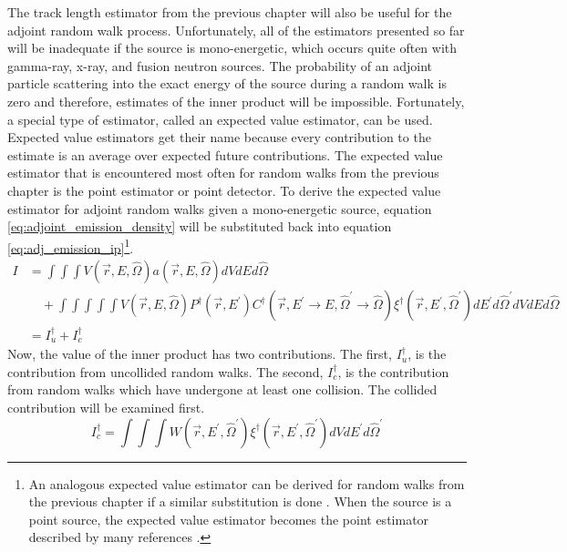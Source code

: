 The track length estimator from the previous chapter will also be useful for the
adjoint random walk process. Unfortunately, all of the estimators presented so
far will be inadequate if the source is mono-energetic, which occurs quite often
with gamma-ray, x-ray, and fusion neutron sources. The probability of an adjoint
particle scattering into the exact energy of the source during a random walk is 
zero and therefore, estimates of the inner product will be impossible. 
Fortunately, a special type of estimator, called an expected value estimator, 
can be used. Expected value estimators get their name because every 
contribution to the estimate is an average over expected future contributions. 
The expected value estimator that is encountered most often for random walks 
from the previous chapter is the point estimator or point detector. To derive 
the expected value estimator for adjoint random walks given a mono-energetic 
source, equation \ref{eq:adjoint_emission_density} will be substituted back 
into equation \ref{eq:adj_emission_ip}\footnote{An analogous expected value 
estimator can be derived for random walks from the previous chapter if a similar
substitution is done \citep{spanier_monte_1969}. When the source is a point 
source, the expected value estimator becomes the point estimator described by
many references \citep{x-5_monte_carlo_team_mcnp_2003, kalos_estimation_1963}.}.
\begin{align}
  I & = \int\int\int V(\vec{r},E,\hat{\Omega})a(\vec{r},E,\hat{\Omega})
  dVdEd\hat{\Omega} \nonumber \\  
  & \quad + \int\int\int\int\int V(\vec{r},E,\hat{\Omega})
  P^{\dagger}(\vec{r},E^{'}) 
  C^{\dagger}(\vec{r},E^{'} \to E, \hat{\Omega}^{'} \to \hat{\Omega})
  \xi^{\dagger}(\vec{r},E^{'},\hat{\Omega}^{'})dE^{'}d\hat{\Omega}^{'}dVdE
  d\hat{\Omega} \nonumber \\
  & = I_u^{\dagger} + I_c^{\dagger} \nonumber
\end{align}
Now, the value of the inner product has two contributions. The first, 
$I_u^{\dagger}$, is the contribution from uncollided random walks. The second,
$I_c^{\dagger}$, is the contribution from random walks which have undergone at
least one collision. The collided contribution will be examined first.
\begin{equation*}
  I_c^{\dagger} = \int\int\int W(\vec{r},E^{'},\hat{\Omega}^{'})
  \xi^{\dagger}(\vec{r},E^{'},\hat{\Omega}^{'}) dVdE^{'}d\hat{\Omega}^{'}
\end{equation*}
